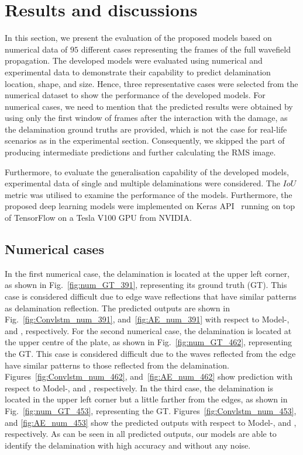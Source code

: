 \section{Results and discussions}
In this section, we present the evaluation of the proposed models based on numerical data of \(95\) different cases representing the frames of the full wavefield propagation. 
The developed models were evaluated using numerical and experimental data to demonstrate their capability to predict delamination location, shape, and size.
Hence, three representative cases were selected from the numerical dataset to show the performance of the developed models.
For numerical cases, we need to mention that the predicted results were obtained by using only the first window of frames after the interaction with the damage, as the delamination ground truths are provided, which is not the case for real-life scenarios as in the experimental section. 
Consequently, we skipped the part of producing intermediate predictions and further calculating the RMS image.

Furthermore, to evaluate the generalisation capability of the developed models, experimental data of single and multiple delaminations were considered.
The \(IoU\) metric was utilised to examine the performance of the models.
Furthermore, the proposed deep learning models were implemented on Keras API~\cite{chollet2015keras} running on top of TensorFlow on a Tesla V100 GPU from NVIDIA.
 
\subsection{Numerical cases}
In the first numerical case, the delamination is located at the upper left corner, as shown in Fig.~\ref{fig:num_GT_391}, representing its ground truth (GT).
This case is considered difficult due to edge wave reflections that have similar patterns as delamination reflection.
The predicted outputs are shown in Fig.~\ref{fig:Convlstm_num_391}, and~\ref{fig:AE_num_391} with respect to Model-, and , respectively.
For the second numerical case, the delamination is located at the upper centre of the plate, as shown in Fig.~\ref{fig:num_GT_462}, representing the GT.
This case is considered difficult due to the waves reflected from the edge have similar patterns to those reflected from the delamination.
Figures~\ref{fig:Convlstm_num_462}, and~\ref{fig:AE_num_462} show prediction with respect to Model-, and , respectively.
In the third case, the delamination is located in the upper left corner but a little farther from the edges, as shown in Fig.~\ref{fig:num_GT_453}, representing the GT. 
Figures~\ref{fig:Convlstm_num_453}, and \ref{fig:AE_num_453} show the predicted outputs with respect to Model-, and , respectively.
As can be seen in all predicted outputs, our models are able to identify the delamination with high accuracy and without any noise.

